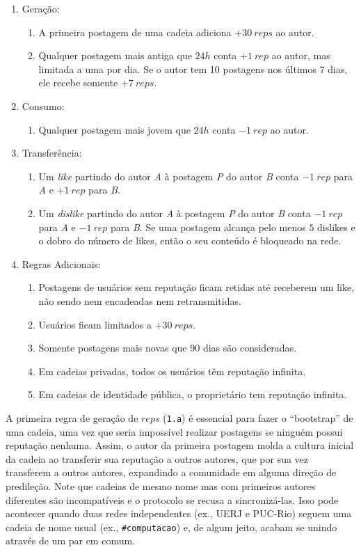 \documentclass[12pt]{article}
\begin{document}
\begin{enumerate}
\item Geração:
    \begin{enumerate}
    \item A primeira postagem de uma cadeia adiciona $+30~reps$ ao autor.
    \item Qualquer postagem mais antiga que $24h$ conta $+1~rep$ ao autor, mas
          limitada a uma por dia. Se o autor tem 10 postagens nos últimos 7
          dias, ele recebe somente $+7~reps$.
    \end{enumerate}
\item Consumo:
    \begin{enumerate}
    \item Qualquer postagem mais jovem que $24h$ conta $-1~rep$ ao autor.
    \end{enumerate}
\item Transferência:
    \begin{enumerate}
    \item Um \emph{like}    partindo do autor \emph{A} à postagem \emph{P} do
          autor \emph{B} conta $-1~rep$ para \emph{A} e $+1~rep$ para \emph{B}.
    \item Um \emph{dislike} partindo do autor \emph{A} à postagem \emph{P} do
          autor \emph{B} conta $-1~rep$ para \emph{A} e $-1~rep$ para \emph{B}.
          Se uma postagem alcança pelo menos $5$ dislikes e o dobro do número
          de likes, então o seu conteúdo é bloqueado na rede.
    \end{enumerate}
\item Regras Adicionais:
    \begin{enumerate}
    \item Postagens de usuários sem reputação ficam retidas até receberem um
          like, não sendo nem encadeadas nem retransmitidas.
    \item Usuários ficam limitados a $+30~reps$.
    \item Somente postagens mais novas que 90 dias são consideradas.
    \item Em cadeias privadas, todos os usuários têm reputação infinita.
    \item Em cadeias de identidade pública, o proprietário tem reputação
          infinita.
    \end{enumerate}
\end{enumerate}
%
A primeira regra de geração de $reps$ (\texttt{1.a}) é essencial para fazer o
``bootstrap'' de uma cadeia, uma vez que seria impossível realizar postagens se
ninguém possui reputação nenhuma.
Assim, o autor da primeira postagem molda a cultura inicial da cadeia ao
transferir sua reputação a outros autores, que por sua vez transferem a outros
autores, expandindo a comunidade em alguma direção de predileção.
%
Note que cadeias de mesmo nome mas com primeiros autores diferentes são
incompatíveis e o protocolo se recusa a sincronizá-las.
Isso pode acontecer quando duas redes independentes (ex., UERJ e PUC-Rio)
seguem uma cadeia de nome usual (ex., \texttt{\#computacao}) e, de algum jeito,
acabam se unindo através de um par em comum.
\end{document}
